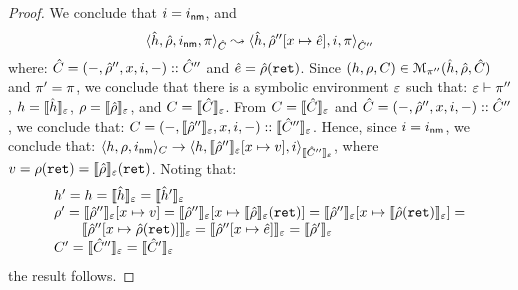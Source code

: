 \begin{proof}
\noindent{} 
We conclude that $i =  \procretlab$, and 
$$\symbtrans{\sheap, \sstore, \procretlab, \pc}{\sheap, \sstore''[\jvar \mapsto \sexpr], i, \pc}[\sctx][\sctx'']$$
where: 
$\sctx = (-, \sstore'', \jvar, i, -) :: \sctx''$ and $\sexpr = \sstore(\procretvar)$. 
Since $(\heap, \store, \ctx) \in \smodels{\sheap, \sstore, \sctx}{\pc''}$ and $\pc' = \pc$, we conclude that 
there is a symbolic environment $\senv$ such that: $\senv \vdash \pc''$, 
$\heap = \semexpr{\sheap}{\senv}$, $\store = \semexpr{\sstore}{\senv}$, 
and $\ctx = \semexpr{\sctx}{\senv}$.
From $\ctx = \semexpr{\sctx}{\senv}$ and $\sctx = (-, \sstore'', \jvar, i, -) :: \sctx''$, we conclude 
that: $\ctx =  (-, \semexpr{\sstore''}{\senv}, \jvar, i, -) :: \semexpr{\sctx''}{\senv}$.
Hence, since $i =  \procretlab$, 
we conclude that: $\semtrans{\heap, \store, \procretlab}{\heap, \semexpr{\sstore''}{\senv}[\jvar \mapsto \val], i}[C][\semexpr{\sctx''}{\senv}]$, 
where $\val =  \store(\procretvar) = \semexpr{\sstore}{\senv}(\procretvar)$.
Noting that: 
$$ 
 \begin{array}{l}
  \heap' = \heap = \semexpr{\sheap}{\senv} = \semexpr{\sheap'}{\senv} \\ 
  \store' = \semexpr{\sstore''}{\senv}[\jvar \mapsto \val] = 
       \semexpr{\sstore''}{\senv}[\jvar \mapsto \semexpr{\sstore}{\senv}(\procretvar)] = 
        \semexpr{\sstore''}{\senv}[\jvar \mapsto \semexpr{\sstore(\procretvar)}{\senv}] = \\
       \qquad  \semexpr{\sstore''[\jvar \mapsto \sstore(\procretvar)]}{\senv}  = 
       \semexpr{\sstore''[\jvar \mapsto \sexpr]}{\senv}  = 
       \semexpr{\sstore'}{\senv}  \\ 
 \ctx' = \semexpr{\sctx''}{\senv} = \semexpr{\sctx'}{\senv} 
\end{array}
$$
the result follows. 
\vspace{6pt}


\end{proof}
